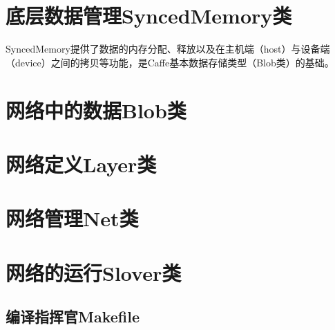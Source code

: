 \documentclass{../CNTeXBookTemplate/NanCNBook}
\begin{document}
\chapter{底层数据管理SyncedMemory类}
SyncedMemory提供了数据的内存分配、释放以及在主机端（host）与设备端（device）之间的拷贝等功能，是Caffe基本数据存储类型（Blob类）的基础。

\chapter{网络中的数据Blob类}

\chapter{网络定义Layer类}

\chapter{网络管理Net类}

\chapter{网络的运行Slover类}



\begin{cnappendix}
\chapter{编译指挥官Makefile}

\end{cnappendix}
\end{document}

